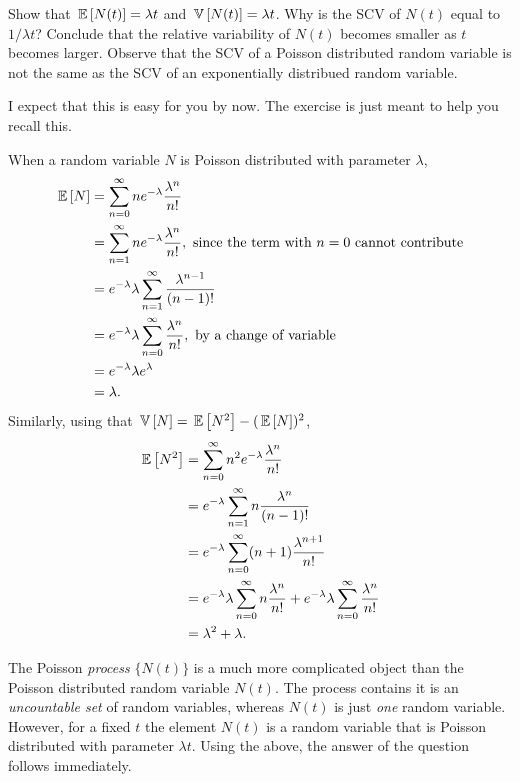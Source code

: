 \begin{question}
  Show that $\,\mathbb{E}\left[N(t)\right] = \lambda t$ and $\,\mathbb{V}\left[N(t)\right] = \lambda t$. Why is
  the SCV of $N(t)$ equal to $1/\lambda t$? Conclude that the relative
  variability of $N(t)$ becomes smaller as $t$ becomes larger. Observe
  that the SCV of a Poisson distributed random variable is not the
  same as the SCV of an exponentially distribued random variable.


  \begin{solution} I expect that this is easy for you by now. The
    exercise is just meant to help you recall this.

    When a random variable $N$ is Poisson distributed with parameter
    $\lambda$,
    \begin{equation*}
      \begin{split}
      \,\mathbb{E}\left[N\right] 
&= \sum_{n=0}^\infty n e^{-\lambda}\frac{\lambda^n}{n!}  \\
&= \sum_{n=1}^\infty n e^{-\lambda}\frac{\lambda^n}{n!}, \text{ since the term with $n=0$ cannot contribute} \\
&= e^{-\lambda} \lambda \sum_{n=1}^\infty \frac{\lambda^{n-1}}{(n-1)!} \\
&= e^{-\lambda} \lambda \sum_{n=0}^\infty \frac{\lambda^{n}}{n!}, \text{ by a change of variable}\\
&= e^{-\lambda} \lambda e^{\lambda} \\
&= \lambda.
      \end{split}
    \end{equation*}
Similarly, using that $\,\mathbb{V}\left[N\right] = \,\mathbb{E}\left[N^2\right] - (\,\mathbb{E}\left[N\right])^2$, 
    \begin{equation*}
      \begin{split}
      \,\mathbb{E}\left[N^2\right]
&= \sum_{n=0}^\infty n^2 e^{-\lambda}\frac{\lambda^n}{n!}  \\
&= e^{-\lambda} \sum_{n=1}^\infty n \frac{\lambda^n}{(n-1)!}  \\
&= e^{-\lambda} \sum_{n=0}^\infty (n+1) \frac{\lambda^{n+1}}{n!}  \\
&= e^{-\lambda} \lambda \sum_{n=0}^\infty n \frac{\lambda^{n}}{n!}  +e^{-\lambda}\lambda \sum_{n=0}^\infty\frac{\lambda^{n}}{n!}  \\
&= \lambda^2  + \lambda.
\end{split}
\end{equation*}

The Poisson \emph{process} $\{N(t)\}$ is a much more complicated
object than the Poisson distributed random variable $N(t)$. The
process contains it is an \emph{ uncountable set} of random variables,
whereas $N(t)$ is just \emph{one} random variable. However, for a
fixed $t$ the element $N(t)$ is a random variable that is Poisson
distributed with parameter $\lambda t$. Using the above, the answer of
the question follows immediately.



\end{solution}
\end{question}
